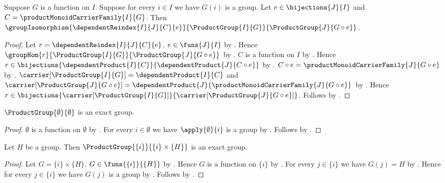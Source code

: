 \begin{theorem}\label{bijective_product_group_reindex_isomorphism}
    Suppose $G$ is a function on $I$.
    Suppose for every $i\in I$ we have $G(i)$ is a group.
    Let $e\in\bijections{J}{I}$ and
        $C=\productMonoidCarrierFamily{I}{G}$.
    Then
        $\groupIsomorphism{\dependentReindex{I}{J}{C}{e}}{
            \ProductGroup{I}{G}}{\ProductGroup{J}{G\circ e}}$.
\end{theorem}
\begin{proof}
    Let $r=\dependentReindex{I}{J}{C}{e}$.
    $e\in\funs{J}{I}$ by .
    Hence $\groupHom{r}{\ProductGroup{I}{G}}{
        \ProductGroup{J}{G\circ e}}$ by
        .
    $C$ is a function on $I$ by
        .
    Hence $r\in\bijections{\dependentProduct{I}{C}}{
        \dependentProduct{J}{C\circ e}}$ by
        .
    $C\circ e=\productMonoidCarrierFamily{J}{G\circ e}$ by
        .
    $\carrier[\ProductGroup{I}{G}]=\dependentProduct{I}{C}$ and
        $\carrier[\ProductGroup{J}{G\circ e}]
            =\dependentProduct{J}{
                \productMonoidCarrierFamily{J}{G\circ e}}$ by
        .
    Hence $r\in\bijections{\carrier[\ProductGroup{I}{G}]}{
        \carrier[\ProductGroup{J}{G\circ e}]}$.
    Follows by .
\end{proof}

\begin{proposition}\label{empty_product_group_is_exact}
    $\ProductGroup{\emptyset}{\emptyset}$ is an exact group.
\end{proposition}
\begin{proof}
    $\emptyset$ is a function on $\emptyset$ by
        .
    For every $i\in\emptyset$ we have $\apply{\emptyset}{i}$ is a group
        by .
    Follows by .
\end{proof}

\begin{proposition}\label{singleton_product_group_is_exact}
    Let $H$ be a group.
    Then $\ProductGroup{\{i\}}{\{i\}\times\{H\}}$ is an exact group.
\end{proposition}
\begin{proof}
    Let $G=\{i\}\times\{H\}$.
    $G\in\funs{\{i\}}{\{H\}}$ by .
    Hence $G$ is a function on $\{i\}$ by
        .
    For every $j\in\{i\}$ we have $G(j)=H$ by
        .
    Hence for every $j\in\{i\}$ we have $G(j)$ is a group by
        \auto.
    Follows by .
\end{proof}

